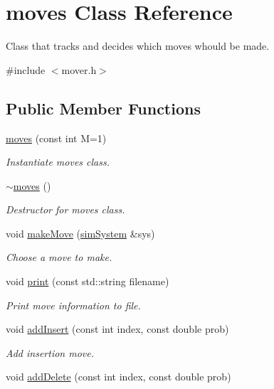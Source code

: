 \hypertarget{classmoves}{\section{moves Class Reference}
\label{classmoves}
}


Class that tracks and decides which moves whould be made.  




{\ttfamily \#include $<$mover.\-h$>$}

\subsection*{Public Member Functions}
\begin{DoxyCompactItemize}
\item 
\hyperlink{classmoves_a1964259b17a057e8b363736e42fca3e8}{moves} (const int M=1)
\begin{DoxyCompactList}\small\item\em Instantiate moves class. \end{DoxyCompactList}\item 
\hyperlink{classmoves_a00dfff19abe056adceb0ccf41778ee0f}{$\sim$moves} ()
\begin{DoxyCompactList}\small\item\em Destructor for moves class. \end{DoxyCompactList}\item 
void \hyperlink{classmoves_a7f023913b80bb62604b99f4dbf005c37}{make\-Move} (\hyperlink{classsim_system}{sim\-System} \&sys)
\begin{DoxyCompactList}\small\item\em Choose a move to make. \end{DoxyCompactList}\item 
void \hyperlink{classmoves_acc6415d4000f01b93235d1a533aa6880}{print} (const std\-::string filename)
\begin{DoxyCompactList}\small\item\em Print move information to file. \end{DoxyCompactList}\item 
void \hyperlink{classmoves_ab4583b3075f51cce55c3aeb84a58430d}{add\-Insert} (const int index, const double prob)
\begin{DoxyCompactList}\small\item\em Add insertion move. \end{DoxyCompactList}\item 
void \hyperlink{classmoves_ac4307636570c4d4bc07c4cba3887005e}{add\-Delete} (const int index, const double prob)

\end{DoxyCompactItemize}
